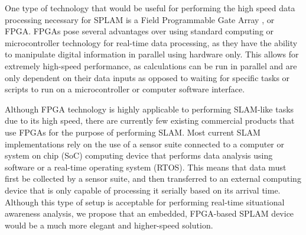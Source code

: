 One type of technology that would be useful for performing the high speed data processing necessary for SPLAM is a Field Programmable Gate Array , or FPGA. FPGAs pose several advantages over using standard computing or microcontroller technology for real-time data processing, as they have the ability to manipulate digital information in parallel using hardware only. This allows for extremely high-speed performance, as calculations can be run in parallel and are only dependent on their data inputs as opposed to waiting for specific tasks or scripts to run on a microcontroller or computer software interface. 
\par
Although FPGA technology is highly applicable to performing SLAM-like tasks due to its high speed, there are currently few existing commercial products that use FPGAs for the purpose of performing SLAM. Most current SLAM implementations rely on the use of a sensor suite connected to a computer or system on chip (SoC) computing device that performs data analysis using software or a real-time operating system (RTOS). This means that data must first be collected by a sensor suite, and then transferred to an external computing device that is only capable of processing it serially based on its arrival time. Although this type of setup is acceptable for performing real-time situational awareness analysis, we propose that an embedded, FPGA-based SPLAM device would be a much more elegant and higher-speed solution. 